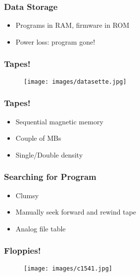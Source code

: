 \documentclass[aspectratio=43]{uva-inf-presentation}
\begin{document}
\begin{frame}
\frametitle{Data Storage}

\begin{itemize}
\item Programs in RAM, firmware in ROM
\item Power loss: program gone!
\end{itemize}

\end{frame}


\begin{frame}
\frametitle{Tapes!}

\begin{figure}
\texttt{[image: images/datasette.jpg]}
\end{figure}

\end{frame}


\begin{frame}
\frametitle{Tapes!}

\begin{itemize}
\item Sequential magnetic memory
\item Couple of MBs
\item Single/Double density
\end{itemize}

\end{frame}


\begin{frame}
\frametitle{Searching for Program}

\begin{itemize}
\item Clumsy
\item Manually seek forward and rewind tape
\item Analog file table
\end{itemize}

\end{frame}


\begin{frame}
\frametitle{Floppies!}

\begin{figure}
\texttt{[image: images/c1541.jpg]}
\end{figure}

\end{frame}
\end{document}
